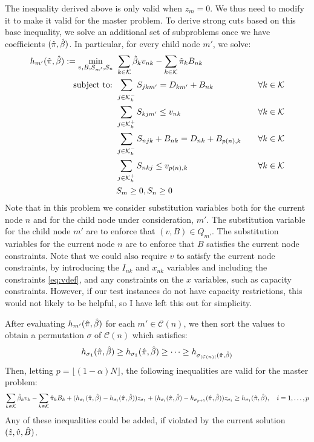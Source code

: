 \documentclass[10pt]{article}
\newcommand{\ka}{k} %
\newcommand{\KA}{\mathcal{K}}
\newcommand{\jey}{j} %
\newcommand{\Bi}{B} %
\newcommand{\Vi}{v} %
\newcommand{\Es}{S} %
\newcommand{\Zed}{z} %
\newcommand{\x}{x} %
\newcommand{\cn}{\mathcal{C}(n) }
\newcommand{\Csub}{\mathcal{K}^+_k}
\newcommand{\Psub}{\mathcal{K}^-_k}
\begin{document}
The inequality derived above is only valid when $\Zed_m = 0$. We thus need to modify it to make it valid for the master problem.
To derive strong cuts based on this base inequality, we solve an additional set of subproblems once we have coefficients $(\hat{\pi},\hat{\beta})$. In particular, for every child node $m'$, we solve:
\begin{align*}
h_{m'}(\pisol,\betasol) := \min_{v,B,\Es_{m'},\Es_n} \ & \sum_{\ka  \in \KA} \betasol_k \Vi_{n \ka} - \sum_{\ka  \in \KA} \pisol_k \Bi_{n  \ka} \\
\text{subject to: } &  \sum_{\jey \in  \Psub} \Es_{\jey \ka m'} = D_{km'} + \Bi_{n  \ka} \ &\forall \ka  \in \KA  \\
    &\sum_{\jey \in  \Csub} \Es_{\ka \jey m'} \leq \Vi_{n \ka} \ &\forall \ka  \in \KA \\
    & \sum_{\jey \in  \Psub} {S}_{n \jey \ka} + \Bi_{n  \ka}  = D_{n \ka} + \Bi_{p(n), \ka} \quad &\forall \ka  \in \KA \\
    & \sum_{\jey \in  \Csub} {S}_{n \ka \jey} \leq \Vi_{p(n), \ka}  \quad &\forall \ka  \in \KA\\
    & \Es_m \geq 0, \Es_n \geq 0
\end{align*}
Note that in this problem we consider substitution variables both for the current node $n$ and for the child node under consideration, $m'$. The substitution variable for the child node $m'$ are to enforce that $(v,B) \in Q_{m'}$. The substitution variables for the current node $n$ are to enforce that $B$ satisfies the current node constraints. Note that we could also require $v$ to satisfy the current node constraints, by introducing the $I_{n \ka}$ and $\x_{n \ka}$ variables and including the constraints \eqref{eq:vdef}, and any constraints on the $x$ variables, such as capacity constraints. However, if our test instances do not have capacity restrictions, this would not likely to be helpful, so I have left this out for simplicity.

After evaluating $h_{m'}(\hat{\pi},\hat{\beta})$ for each $m' \in \cn$, we then sort the values to obtain a permutation $\sigma$ of $\cn$ which satisfies:
\[ h_{\sigma_1}(\pisol,\betasol) \geq h_{\sigma_1}(\pisol,\betasol)  \geq \cdots \geq h_{\sigma_{|\cn|}(\pisol,\betasol)}
 \]
Then, letting $p = \lfloor (1-\alpha) N \rfloor$, the following inequalities are valid for the master problem:
\[ \sum_{\ka  \in \KA} \betasol_k \Vi_k - \sum_{\ka  \in \KA} \pisol_k \Bi_k + 
(h_{\sigma_1}(\pisol,\betasol) - h_{\sigma_i}(\pisol,\betasol))\Zed_{\sigma_1} + 
(h_{\sigma_i}(\pisol,\betasol) - h_{\sigma_{p+1}}(\pisol,\betasol))\Zed_{\sigma_i} \geq h_{\sigma_1}(\pisol,\betasol), \quad i=1,\ldots, p \]
Any of these inequalities could be added, if violated by the current solution $(\zsol,\vsol,\bsol)$.
\end{document}
